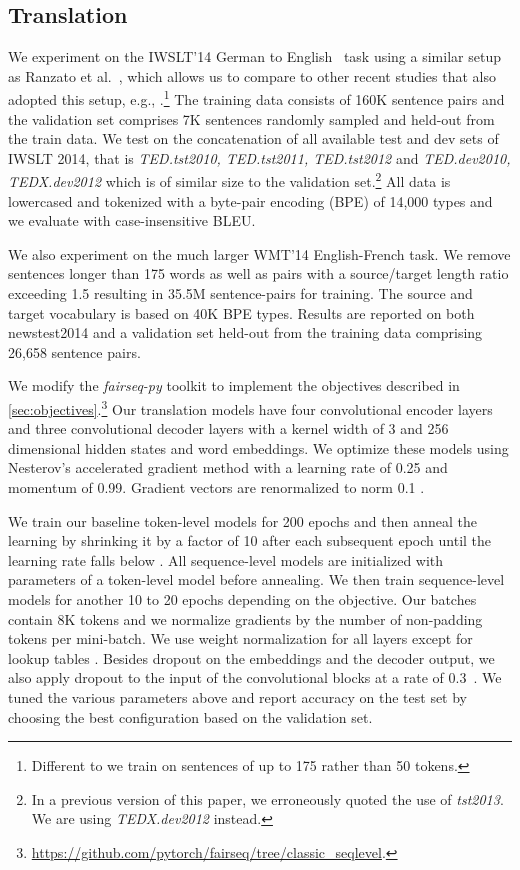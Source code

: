 \documentclass[11pt,a4paper]{article}
\begin{document}
\subsection{Translation}
\label{sec:expsetup_translation}
We experiment on the IWSLT'14 German to English~\citep{cettolo2014report} task using a similar setup as Ranzato et al.~, which allows us to compare to other recent studies that also adopted this setup, e.g., \citet{wiseman2016acl}.\footnote{Different to \citet{ranzato2015sequence} we train on sentences of up to 175 rather than 50 tokens.}
The training data consists of 160K sentence pairs and the validation set comprises 7K sentences randomly sampled and held-out from the train data.
We test on the concatenation of all available test and dev sets of IWSLT 2014, that is \textit{TED.tst2010, TED.tst2011, TED.tst2012} and \textit{TED.dev2010, TEDX.dev2012} which is of similar size to the validation set.\footnote{In a previous version of this paper, we erroneously quoted the use of \textit{tst2013}. We are using \emph{TEDX.dev2012} instead.}
All data is lowercased and tokenized with a byte-pair encoding (BPE) of 14,000 types \citep{sennrich2016bpe} and we evaluate with case-insensitive BLEU.

We also experiment on the much larger WMT'14 English-French task. 
We remove sentences longer than 175 words as well as pairs with a source/target length ratio exceeding 1.5 resulting in 35.5M sentence-pairs for training.
The source and target vocabulary is based on 40K BPE types.
Results are reported on both newstest2014 and a validation set held-out from the training data comprising 26,658 sentence pairs.

We modify the \emph{fairseq-py} toolkit to implement the objectives described in \textsection\ref{sec:objectives}.\footnote{\url{https://github.com/pytorch/fairseq/tree/classic_seqlevel}.}
Our translation models have four convolutional encoder layers and three convolutional decoder layers with a kernel width of 3 and 256 dimensional hidden states and word embeddings.
We optimize these models using Nesterov's accelerated gradient method \citep{sutskever2013icml} with a learning rate of 0.25 and momentum of 0.99.
  Gradient vectors are renormalized to norm 0.1 \citep{pascanu2013difficulty}.

We train our baseline token-level models for 200 epochs and then anneal the learning by shrinking it by a factor of 10 after each subsequent epoch until the learning rate falls below .
All sequence-level models are initialized with parameters of a token-level model before annealing.
We then train sequence-level models for another 10 to 20 epochs depending on the objective.
Our batches contain 8K tokens and we normalize gradients by the number of non-padding tokens per mini-batch.
We use weight normalization for all layers except for lookup tables \citep{salimans2016weight}.
Besides dropout on the embeddings and the decoder output, we also apply dropout to the input of the convolutional blocks at a rate of 0.3~\citep{srivastava2014dropout}.
We tuned the various parameters above and report accuracy on the test set by choosing the best configuration based on the validation set.
\end{document}
